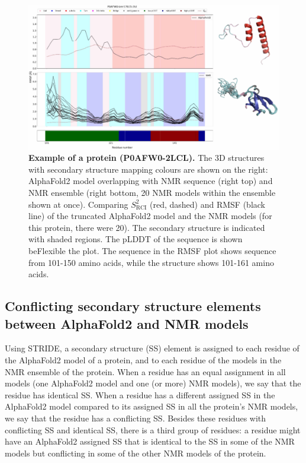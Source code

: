 \begin{figure}[H]
    \centering
    \includegraphics[width=\linewidth]{pLDDT//plddt_figures//supplementary_bhawna/supfig23.pdf}
    \caption{\textbf{Example of a protein (P0AFW0-2LCL).} The 3D structures with secondary structure mapping colours are shown on the right: AlphaFold2 model overlapping with NMR sequence (right top) and NMR ensemble (right bottom, 20 NMR models within the ensemble shown at once). Comparing $S_{\text{RCI}}^{2}$ (red, dashed) and RMSF (black line) of the truncated AlphaFold2 model and the NMR models (for this protein, there were 20). The secondary structure is indicated with shaded regions. The pLDDT of the sequence is shown beFlexible the plot. The sequence in the RMSF plot shows sequence from 101-150 amino acids, while the structure shows 101-161 amino acids.}
    \label{fig:plddt_sup:sup23}
\end{figure}

\subsection*{Conflicting secondary structure elements between AlphaFold2 and NMR models}

Using STRIDE, a secondary structure (SS) element is assigned to each residue of the AlphaFold2 model of a protein, and to each residue of the models in the NMR ensemble of the protein. When a residue has an equal assignment in all models (one AlphaFold2 model and one (or more) NMR models), we say that the residue has identical SS. When a residue has a different assigned SS in the AlphaFold2 model compared to its assigned SS in all the protein’s NMR models, we say that the residue has a conflicting SS. Besides these residues with conflicting SS and identical SS, there is a third group of residues: a residue might have an AlphaFold2 assigned SS that is identical to the SS in some of the NMR models but conflicting in some of the other NMR models of the protein.

